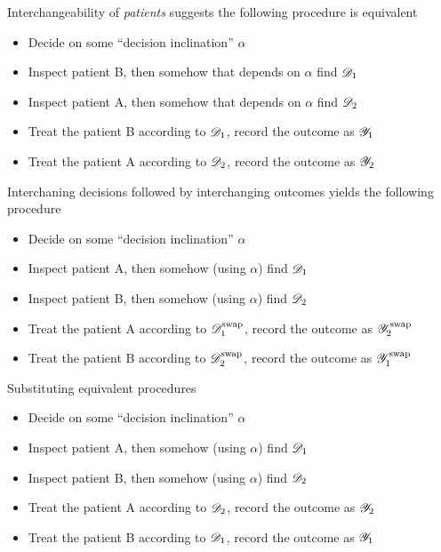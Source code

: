 Interchangeability of \emph{patients} suggests the following procedure is equivalent

\begin{itemize}
    \item Decide on some ``decision inclination'' $\alpha$
    \item Inspect patient B, then somehow that depends on $\alpha$ find $\mathscr{D}_1$
    \item Inspect patient A, then somehow that depends on $\alpha$ find $\mathscr{D}_2$
    \item Treat the patient B according to $\mathscr{D}_1$, record the outcome as $\mathscr{Y}_1$
    \item Treat the patient A according to $\mathscr{D}_2$, record the outcome as $\mathscr{Y}_2$
\end{itemize}

Interchaning decisions followed by interchanging outcomes yields the following procedure

\begin{itemize}
    \item Decide on some ``decision inclination'' $\alpha$
    \item Inspect patient A, then somehow (using $\alpha$) find $\mathscr{D}_1$
    \item Inspect patient B, then somehow (using $\alpha$) find $\mathscr{D}_2$
    \item Treat the patient A according to $\mathscr{D}_1^{\text{swap}}$, record the outcome as $\mathscr{Y}_2^{\text{swap}}$
    \item Treat the patient B according to $\mathscr{D}_2^{\text{swap}}$, record the outcome as $\mathscr{Y}_1^{\text{swap}}$
\end{itemize}

Substituting equivalent procedures

\begin{itemize}
    \item Decide on some ``decision inclination'' $\alpha$
    \item Inspect patient A, then somehow (using $\alpha$) find $\mathscr{D}_1$
    \item Inspect patient B, then somehow (using $\alpha$) find $\mathscr{D}_2$
    \item Treat the patient A according to $\mathscr{D}_2$, record the outcome as $\mathscr{Y}_2$
    \item Treat the patient B according to $\mathscr{D}_1$, record the outcome as $\mathscr{Y}_1$
\end{itemize}

